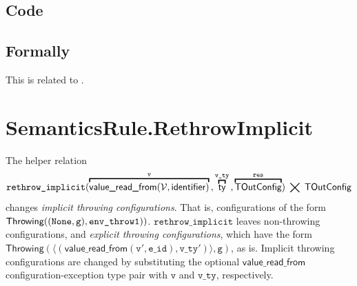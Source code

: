 \documentclass{book}
\newcommand\eqname[0]{\stackrel{\mathsmaller{\mathsf{is}}}{=}}
\newcommand\eqdef[0]{:=}
\newcommand\overname[2]{\overbracket{#1}^{#2}}
\newcommand\tenv[0]{\textsf{tenv}}
\newcommand\vals[0]{\mathcal{V}}
\newcommand\evalarrow[0]{\stackrel{\mathsf{asl}}{\rightsquigarrow}}
\newcommand\aslrel[0]{\bigtimes}
\newcommand\aslsep[0]{\mathbf{,}}
\newcommand\TOutConfig[0]{\textsf{TOutConfig}}
\newcommand\rethrowimplicit[0]{\texttt{rethrow\_implicit}}
\newcommand\typesatisfies[0]{\texttt{type\_satisfies}}
\newcommand\valuereadfrom[0]{\textsf{value\_read\_from}}
\newcommand\Throwing[0]{\textsf{Throwing}}
\newcommand\vc[0]{\texttt{c}}
\newcommand\vg[0]{\texttt{g}}
\newcommand\vv[0]{\texttt{v}}
\newcommand\vs[0]{\texttt{s}}
\newcommand\vres[0]{\texttt{res}}
\newcommand\catchers[0]{\texttt{catchers}}
\newcommand\catchersone[0]{\texttt{catchers1}}
\newcommand\envthrowone[0]{\texttt{env\_throw1}}
\newcommand\ety[0]{\texttt{e\_ty}}
\newcommand\vvty[0]{\texttt{v\_ty}}
\newcommand\nameopt[0]{\texttt{name\_opt}}
\newcommand\eid[0]{\texttt{e\_id}}
\begin{document}
\subsection{Code}

\begin{emptyformal}
\subsection{Formally}
\end{emptyformal}

This is related to .

\section{SemanticsRule.RethrowImplicit \label{sec:SemanticsRule.RethrowImplicit}}

The helper relation
\[
  \rethrowimplicit(\overname{\valuereadfrom(\vals,\identifier)}{\vv} \aslsep \overname{\ty}{\vvty} \aslsep \overname{\TOutConfig}{\vres}) \;\aslrel\; \TOutConfig
\]
changes \emph{implicit throwing configurations}. That is,
configurations of the form $\Throwing((\None, \vg), \envthrowone))$.
$\rethrowimplicit$ leaves non-throwing configurations, and \emph{explicit throwing configurations},
which have the form $\Throwing(\langle(\valuereadfrom(\vv', \eid), \vvty')\rangle, \vg)$, as is.
Implicit throwing configurations are changed by substituting the optional $\valuereadfrom$ configuration-exception type
pair with $\vv$ and $\vvty$, respectively.
\end{document}
